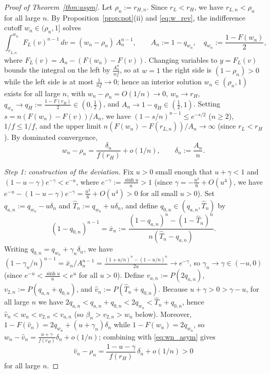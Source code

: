 \documentclass[12pt]{article}
\theoremstyle{mystyle}
\theoremstyle{mystyle2}
\newcommand{\1}{\mathbf{1}}
\begin{document}
\begin{proof}[Proof of Theorem~\ref{thm:asym}]
Let $\rho_n:=r_{H,n}$. Since $r_L<r_H$, we have $r_{L,n}<\rho_n$ for all large $n$. By Proposition~\ref{prop:pot}(ii) and \eqref{eq:w_rev}, the indifference cutoff $w_n\in(\rho_n,1]$ solves
\[
\int_{r_{L,n}}^{w_n} F_L(v)^{n-1}\,dv = (w_n-\rho_n)\,A_n^{n-1}, \qquad A_n:=1-q_{w_n},\quad q_{w_n}:=\frac{1-F(w_n)}{2},
\]
where $F_L(v)=A_n-(F(w_n)-F(v))$. Changing variables to $y=F_L(v)$ bounds the integral on the left by $\frac{A_n^n}{n\underline f}$, so at $w=1$ the right side is $(1-\rho_n)>0$ while the left side is at most $\frac{1}{n\underline f}\to 0$; hence an interior solution $w_n\in(\rho_n,1)$ exists for all large $n$, with $w_n-\rho_n=O(1/n)\to 0$, $w_n\to r_H$, $q_{w_n}\to q_H:=\frac{1-F(r_H)}{2}\in(0,\frac{1}{2})$, and $A_n\to 1-q_H\in(\frac{1}{2},1)$. Setting $s=n(F(w_n)-F(v))/A_n$, we have $(1-s/n)^{n-1}\le e^{-s/2}$ ($n\ge 2$), $1/f\le 1/\underline f$, and the upper limit $n(F(w_n)-F(r_{L,n}))/A_n\to\infty$ (since $r_L<r_H$). By dominated convergence,
\begin{equation}\label{eq:wn_asym}
w_n - \rho_n = \frac{\delta_n}{f(r_H)} + o(1/n), \qquad \delta_n := \frac{A_n}{n}.
\end{equation}

\emph{Step 1: construction of the deviation.} Fix $u>0$ small enough that $u+\gamma<1$ and $(1-u-\gamma)e^{-\gamma}<e^{-u}$, where $e^{-\gamma}:=\frac{\sinh u}{u}>1$ (since $\gamma=-\frac{u^2}{6}+O(u^4)$, we have $e^{-u}-(1-u-\gamma)e^{-\gamma}=\frac{u^2}{6}+O(u^4)>0$ for all small $u>0$). Set $q_{a,n}:=q_{w_n}-u\delta_n$ and $\hat T_n:=q_{w_n}+u\delta_n$, and define $q_{0,n}\in(q_{a,n},\hat T_n)$ by
\begin{equation}\label{eq:asym_indiff}
(1-q_{0,n})^{n-1} = \bar x_n := \frac{(1-q_{a,n})^n-(1-\hat T_n)^n}{n(\hat T_n-q_{a,n})}.
\end{equation}
Writing $q_{0,n}=q_{w_n}+\gamma_n \delta_n$, we have $(1-\gamma_n/n)^{n-1}=\bar x_n/A_n^{n-1}=\frac{(1+u/n)^n-(1-u/n)^n}{2u}\to e^{-\gamma}$, so $\gamma_n\to\gamma\in(-u,0)$ (since $e^{-u}<\frac{\sinh u}{u}<e^u$ for all $u>0$). Define $v_{a,n}:=P(2q_{a,n})$, $v_{2,n}:=P(q_{a,n}+q_{0,n})$, and $\hat v_n:=P(\hat T_n+q_{0,n})$. Because $u+\gamma>0>\gamma-u$, for all large $n$ we have $2q_{a,n}<q_{a,n}+q_{0,n}<2q_{w_n}<\hat T_n+q_{0,n}$, hence $\hat v_n<w_n<v_{2,n}<v_{a,n}$ (so $\beta_n>v_{2,n}>w_n$ below). Moreover, $1-F(\hat v_n)=2q_{w_n}+(u+\gamma_n)\delta_n$ while $1-F(w_n)=2q_{w_n}$, so $w_n-\hat v_n=\frac{u+\gamma}{f(r_H)}\delta_n+o(1/n)$; combining with \eqref{eq:wn_asym} gives
\[
\hat v_n - \rho_n = \frac{1-u-\gamma}{f(r_H)}\,\delta_n + o(1/n) > 0
\]
for all large $n$.


\end{proof}
\end{document}

